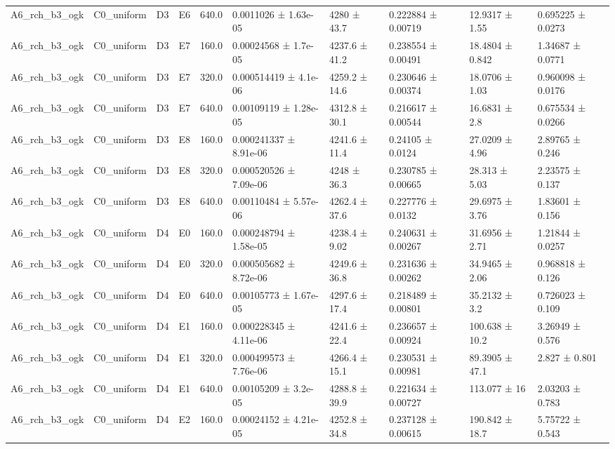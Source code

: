 \begin{table}
\begin{tabular}{llllllllll}
A6\_rch\_b3\_ogk & C0\_uniform & D3 & E6 & 640.0 & 0.0011026 ± 1.63e-05 & 4280 ± 43.7 & 0.222884 ± 0.00719 & 12.9317 ± 1.55 & 0.695225 ± 0.0273 \\
A6\_rch\_b3\_ogk & C0\_uniform & D3 & E7 & 160.0 & 0.00024568 ± 1.7e-05 & 4237.6 ± 41.2 & 0.238554 ± 0.00491 & 18.4804 ± 0.842 & 1.34687 ± 0.0771 \\
A6\_rch\_b3\_ogk & C0\_uniform & D3 & E7 & 320.0 & 0.000514419 ± 4.1e-06 & 4259.2 ± 14.6 & 0.230646 ± 0.00374 & 18.0706 ± 1.03 & 0.960098 ± 0.0176 \\
A6\_rch\_b3\_ogk & C0\_uniform & D3 & E7 & 640.0 & 0.00109119 ± 1.28e-05 & 4312.8 ± 30.1 & 0.216617 ± 0.00544 & 16.6831 ± 2.8 & 0.675534 ± 0.0266 \\
A6\_rch\_b3\_ogk & C0\_uniform & D3 & E8 & 160.0 & 0.000241337 ± 8.91e-06 & 4241.6 ± 11.4 & 0.24105 ± 0.0124 & 27.0209 ± 4.96 & 2.89765 ± 0.246 \\
A6\_rch\_b3\_ogk & C0\_uniform & D3 & E8 & 320.0 & 0.000520526 ± 7.09e-06 & 4248 ± 36.3 & 0.230785 ± 0.00665 & 28.313 ± 5.03 & 2.23575 ± 0.137 \\
A6\_rch\_b3\_ogk & C0\_uniform & D3 & E8 & 640.0 & 0.00110484 ± 5.57e-06 & 4262.4 ± 37.6 & 0.227776 ± 0.0132 & 29.6975 ± 3.76 & 1.83601 ± 0.156 \\
A6\_rch\_b3\_ogk & C0\_uniform & D4 & E0 & 160.0 & 0.000248794 ± 1.58e-05 & 4238.4 ± 9.02 & 0.240631 ± 0.00267 & 31.6956 ± 2.71 & 1.21844 ± 0.0257 \\
A6\_rch\_b3\_ogk & C0\_uniform & D4 & E0 & 320.0 & 0.000505682 ± 8.72e-06 & 4249.6 ± 36.8 & 0.231636 ± 0.00262 & 34.9465 ± 2.06 & 0.968818 ± 0.126 \\
A6\_rch\_b3\_ogk & C0\_uniform & D4 & E0 & 640.0 & 0.00105773 ± 1.67e-05 & 4297.6 ± 17.4 & 0.218489 ± 0.00801 & 35.2132 ± 3.2 & 0.726023 ± 0.109 \\
A6\_rch\_b3\_ogk & C0\_uniform & D4 & E1 & 160.0 & 0.000228345 ± 4.11e-06 & 4241.6 ± 22.4 & 0.236657 ± 0.00924 & 100.638 ± 10.2 & 3.26949 ± 0.576 \\
A6\_rch\_b3\_ogk & C0\_uniform & D4 & E1 & 320.0 & 0.000499573 ± 7.76e-06 & 4266.4 ± 15.1 & 0.230531 ± 0.00981 & 89.3905 ± 47.1 & 2.827 ± 0.801 \\
A6\_rch\_b3\_ogk & C0\_uniform & D4 & E1 & 640.0 & 0.00105209 ± 3.2e-05 & 4288.8 ± 39.9 & 0.221634 ± 0.00727 & 113.077 ± 16 & 2.03203 ± 0.783 \\
A6\_rch\_b3\_ogk & C0\_uniform & D4 & E2 & 160.0 & 0.00024152 ± 4.21e-05 & 4252.8 ± 34.8 & 0.237128 ± 0.00615 & 190.842 ± 18.7 & 5.75722 ± 0.543 \\

\end{tabular}
\end{table}
